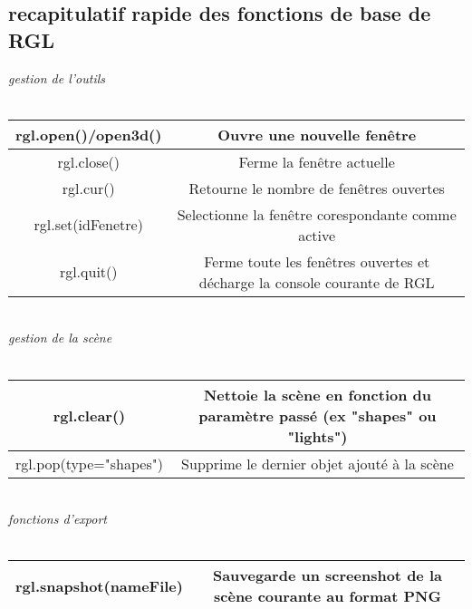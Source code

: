 \subsection{recapitulatif rapide des fonctions de base de RGL}
\textit{gestion de l'outils}\\\\
\begin{tabular}{|c|c|}
\hline 
rgl.open()/open3d() & Ouvre une nouvelle fenêtre \\ \hline
rgl.close() & Ferme la fenêtre actuelle \\ \hline
rgl.cur() & Retourne le nombre de fenêtres ouvertes \\ \hline
rgl.set(idFenetre) & Selectionne la fenêtre corespondante comme active \\ \hline
rgl.quit() & Ferme toute les fenêtres ouvertes et décharge la console courante de RGL \\ \hline
\end{tabular}\\

\textit{gestion de la scène }\\\\
\begin{tabular}{|c|c|}
\hline
rgl.clear() & Nettoie la scène en fonction du paramètre passé (ex "shapes" ou "lights") \\ \hline
rgl.pop(type="shapes") & Supprime le dernier objet ajouté à la scène \\ \hline

\end{tabular}\\

\textit{fonctions d'export}\\\\
\begin{tabular}{|c|c|} 
\hline
rgl.snapshot(nameFile) & Sauvegarde un screenshot de la scène courante au format PNG \\ \hline

\end{tabular}\\


